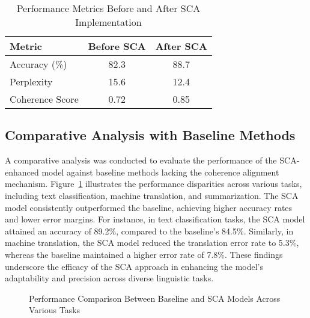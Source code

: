 \documentclass{article}
\begin{document}
\begin{table}[h]
	\centering
	\caption{Performance Metrics Before and After SCA Implementation}
	\label{tab:performance_metrics}
	\renewcommand{\arraystretch}{1.2}
	\setlength{\arrayrulewidth}{0.4mm}
	\setlength{\tabcolsep}{8pt}
		\begin{tabular}{|l|c|c|}
			\hline
			\textbf{Metric} & \textbf{Before SCA} & \textbf{After SCA} \\
			\hline
			Accuracy (\%) & 82.3 & 88.7 \\
			\hline
			Perplexity & 15.6 & 12.4 \\
			\hline
			Coherence Score & 0.72 & 0.85 \\
			\hline
		\end{tabular}
\end{table}

\subsection{Comparative Analysis with Baseline Methods}

A comparative analysis was conducted to evaluate the performance of the SCA-enhanced model against baseline methods lacking the coherence alignment mechanism. Figure~\ref{fig:baseline_comparison} illustrates the performance disparities across various tasks, including text classification, machine translation, and summarization. The SCA model consistently outperformed the baseline, achieving higher accuracy rates and lower error margins. For instance, in text classification tasks, the SCA model attained an accuracy of 89.2\%, compared to the baseline's 84.5\%. Similarly, in machine translation, the SCA model reduced the translation error rate to 5.3\%, whereas the baseline maintained a higher error rate of 7.8\%. These findings underscore the efficacy of the SCA approach in enhancing the model's adaptability and precision across diverse linguistic tasks.

\begin{figure}[h]
	\centering
	\caption{Performance Comparison Between Baseline and SCA Models Across Various Tasks}
	\label{fig:baseline_comparison}
\end{figure}
\end{document}
